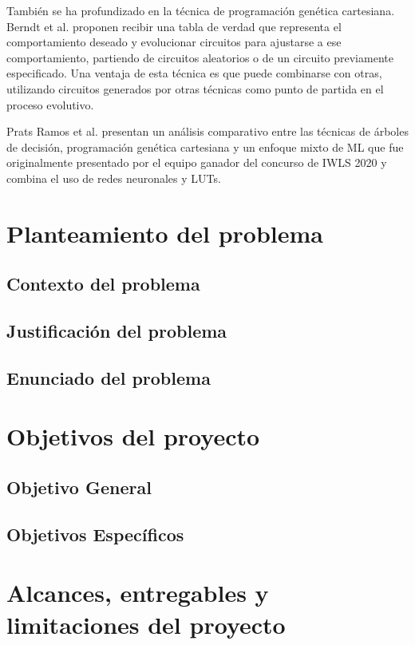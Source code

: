 También se ha profundizado en la técnica de programación genética cartesiana.
Berndt et al. \cite{berndt_cgp-based_2022} proponen recibir una tabla de verdad
que representa el comportamiento deseado y evolucionar circuitos para ajustarse
a ese comportamiento, partiendo de circuitos aleatorios o de un circuito
previamente especificado. Una ventaja de esta técnica es que puede combinarse
con otras, utilizando circuitos generados por otras técnicas como punto de
partida en el proceso evolutivo.

Prats Ramos et al. \cite{prats_ramos_impact_2024} presentan un análisis
comparativo entre las técnicas de árboles de decisión, programación genética
cartesiana y un enfoque mixto de ML que fue originalmente presentado por el
equipo ganador del concurso de IWLS 2020 \cite{rai_logic_2021} y combina el uso
de redes neuronales y LUTs.

\section{Planteamiento del problema}

\subsection{Contexto del problema} \subsection{Justificación del problema}
\subsection{Enunciado del problema}

\section{Objetivos del proyecto}

\subsection{Objetivo General} \subsection{Objetivos Específicos}

\section{Alcances, entregables y limitaciones del proyecto}
